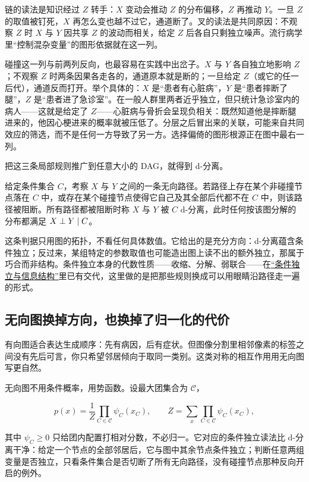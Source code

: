 链的读法是知识经过 \(Z\) 转手：\(X\) 变动会推动 \(Z\) 的分布偏移，\(Z\) 再推动 \(Y\)。一旦 \(Z\) 的取值被钉死，\(X\) 再怎么变也越不过它，通道断了。叉的读法是共同原因：不观察 \(Z\) 时 \(X\) 与 \(Y\) 因共享 \(Z\) 的波动而相关，给定 \(Z\) 后各自只剩独立噪声。流行病学里``控制混杂变量''的图形依据就在这一列。

碰撞这一列与前两列反向，也最容易在实践中出岔子。\(X\) 与 \(Y\) 各自独立地影响 \(Z\)；不观察 \(Z\) 时两条因果各走各的，通道原本就是断的；一旦给定 \(Z\)（或它的任一后代），通道反而打开。举个具体的：\(X\) 是``患者有心脏病''，\(Y\) 是``患者摔断了腿''，\(Z\) 是``患者进了急诊室''。在一般人群里两者近乎独立，但只统计急诊室内的病人——这就是给定了 \(Z\)——心脏病与骨折会呈现负相关：既然知道他是摔断腿进来的，他因心梗进来的概率就被压低了。分层之后冒出来的关联，可能来自共同效应的筛选，而不是任何一方导致了另一方。选择偏倚的图形根源正在图中最右一列。

把这三条局部规则推广到任意大小的 DAG，就得到 d-分离。

\begin{definition}
给定条件集合 \(C\)，考察 \(X\) 与 \(Y\) 之间的一条无向路径。若路径上存在某个非碰撞节点落在 \(C\) 中，或存在某个碰撞节点使得它自己及其全部后代都不在 \(C\) 中，则该路径被阻断。所有路径都被阻断时称 \(X\) 与 \(Y\) 被 \(C\) d-分离，此时任何按该图分解的分布都满足 \(X\perp Y\mid C\)。
\end{definition}

这条判据只用图的拓扑，不看任何具体数值。它给出的是充分方向：d-分离蕴含条件独立；反过来，某组特定的参数取值也可能造出图上读不出的额外独立，那属于巧合而非结构。条件独立本身的代数性质——收缩、分解、弱联合——在\hyperref[sec:05-Probability/02-Conditional-Probability/04]{``条件独立与信息结构''}里已有交代，这里做的是把那些规则换成可以用眼睛沿路径走一遍的形式。

\subsection{无向图换掉方向，也换掉了归一化的代价}

有向图适合表达生成顺序：先有病因，后有症状。但图像分割里相邻像素的标签之间没有先后可言，你只希望邻居倾向于取同一类别。这类对称的相互作用用无向图写更自然。

无向图不用条件概率，用势函数。设最大团集合为 \(\mathcal C\)，

\[
p(x)=\frac{1}{Z}\prod_{C\in\mathcal C}\psi_C(x_C),
\qquad
Z=\sum_{x}\prod_{C\in\mathcal C}\psi_C(x_C),
\]

其中 \(\psi_C\ge 0\) 只给团内配置打相对分数，不必归一。它对应的条件独立读法比 d-分离干净：给定一个节点的全部邻居后，它与图中其余节点条件独立；判断任意两组变量是否独立，只看条件集合是否切断了所有无向路径，没有碰撞节点那种反向开启的例外。

